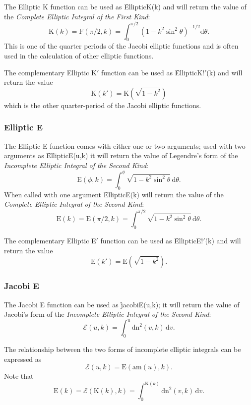 The Elliptic K function can be used as \f{EllipticK(k)} and will
return the value of the \emph{Complete Elliptic Integral of the
First Kind}:
\[\mathrm{K}(k)=\mathrm{F}(\pi/2, k) =\int_0^{\pi/2}(1-k^2 \sin^2 \theta)^{-1/2}\mathrm{d}\theta.\]
This is one of the quarter periods of the Jacobi elliptic
functions and is often used in the calculation of other elliptic functions.

The complementary Elliptic K$'$ function can be used as \f{EllipticK!$'$(k)}
and will return the value
\[\mathrm{K}(k')=\mathrm{K}(\sqrt{1-k^2})\]
which is the other quarter-period of the Jacobi elliptic functions.

\subsubsection{Elliptic E}
\hypertarget{operator:ELLIPTICE}{}
\hypertarget{operator:ELLIPTICE'}{}

The Elliptic E function comes with either one or two arguments;
used with two arguments as \f{EllipticE(u,k)}
it will return the value of Legendre's form of
the \emph{Incomplete Elliptic Integral of the Second Kind}:
\[\mathrm{E}(\phi, k)=\int_0^\phi \sqrt{1-k^2 \sin^2 \theta} \,\mathrm{d}\theta.\]
 When called with one argument \f{EllipticE(k)} will return the value of the
\emph{Complete Elliptic Integral of the Second Kind}:
\[\mathrm{E}(k)=\mathrm{E}(\pi/2, k) =
\int_0^{\pi/2} \sqrt{1-k^2 \sin^2 \theta} \,\mathrm{d}\theta.\]

The complementary Elliptic E$'$ function can be used as \f{EllipticE!$'$(k)}
and will return the value
\[\mathrm{E}(k') = \mathrm{E}(\sqrt{1-k^2}).\]

\subsubsection{Jacobi E}
\hypertarget{operator:JACOBIE}{}
The Jacobi E function can be used as  \f{jacobiE(u,k)};
it will return the value of Jacobi's form of
the \emph{Incomplete Elliptic Integral of the Second Kind}:
\[\mathcal{E}(u, k)=\int_0^u \mathrm{dn}^2 (v, k) \,\mathrm{d}v.\]

The relationship between the two forms of incomplete elliptic integrals can
be expressed as
\[\mathcal{E}(u, k) = \mathrm{E}(\mathrm{am}(u), k).\]
Note that
\[\mathrm{E}(k)=\mathcal{E}(\mathrm{K}(k), k)
=\int_0^{\mathrm{K}(k)} \mathrm{dn}^2(v, k) \,\mathrm{d}v.\]

